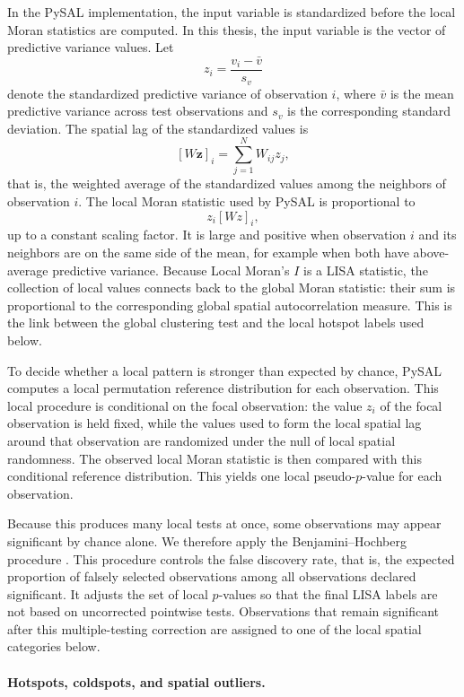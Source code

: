 In the PySAL implementation, the input variable is standardized before the local Moran
statistics are computed. In this thesis, the input variable is the vector of predictive
variance values. Let
\[
z_i = \frac{v_i-\bar{v}}{s_v}
\]
denote the standardized predictive variance of observation $i$, where $\bar{v}$ is the mean
predictive variance across test observations and $s_v$ is the corresponding standard
deviation. The spatial lag of the standardized values is
\[
[W\mathbf{z}]_i = \sum_{j=1}^{N} W_{ij} z_j,
\]
that is, the weighted average of the standardized values among the neighbors of
observation $i$. The local Moran statistic used by PySAL is proportional to
\[
z_i[Wz]_i,
\]
up to a constant scaling factor. It is large and positive when observation $i$ and its neighbors are on the same side of the mean, for example when both have above-average predictive variance. Because Local Moran's $I$ is a LISA statistic, the collection of local values connects back to the global Moran statistic: their sum is proportional to the corresponding global spatial autocorrelation measure. This is the link between the global clustering test and the local hotspot labels used below.

To decide whether a local pattern is stronger than expected by chance, PySAL computes
a local permutation reference distribution for each observation. This local procedure is
conditional on the focal observation: the value $z_i$ of the focal observation is held fixed,
while the values used to form the local spatial lag around that observation are randomized
under the null of local spatial randomness. The observed local Moran statistic is then
compared with this conditional reference distribution. This yields one local pseudo-$p$-value
for each observation.

Because this produces many local tests at once, some observations may appear significant
by chance alone. We therefore apply the Benjamini--Hochberg procedure
\citep{benjamini_hochberg_1995}. This procedure controls the false discovery rate, that
is, the expected proportion of falsely selected observations among all observations declared
significant. It adjusts the set of local $p$-values so that the final LISA
labels are not based on uncorrected pointwise tests. Observations that remain significant
after this multiple-testing correction are assigned to one of the local spatial categories
below.

\paragraph{Hotspots, coldspots, and spatial outliers.}

